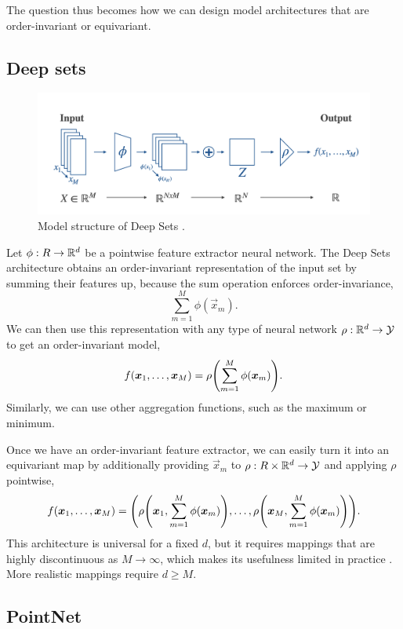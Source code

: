 The question thus becomes how we can design model architectures that are order-invariant or
equivariant.

\subsection{Deep sets}

\begin{figure}[t]
    \includegraphics[width=\textwidth]{figures/deep-sets}
    \caption{Model structure of Deep Sets \citep{zaheer2017deep}.}
    \label{fig:deep-sets}
\end{figure}

Let $\phi: R \to \mathbb{R}^d$ be a pointwise feature extractor neural network. The Deep Sets architecture
\citep{zaheer2017deep} obtains an order-invariant representation of the input set by summing their
features up, because the sum operation enforces order-invariance, \[
    \sum_{m=1}^{M} \phi(\vec{x}_m).
\]
We can then use this representation with any type of neural network $\rho: \mathbb{R}^d \to \mathcal{Y}$ to
get an order-invariant model, \[
    f(\vec{x}_1, \ldots, \vec{x}_M) = \rho \lft( \sum_{m=1}^{M} \phi(\vec{x}_m) \rgt).
\]
Similarly, we can use other aggregation functions, such as the maximum or minimum.

Once we have an order-invariant feature extractor, we can easily turn it into an equivariant map by
additionally providing $\vec{x}_m$ to $\rho: R \times \mathbb{R}^d \to \mathcal{Y}$ and applying $\rho$
pointwise, \[
    f(\vec{x}_1, \ldots, \vec{x}_M) = \lft( \rho \lft( \vec{x}_1, \sum_{m=1}^{M} \phi(\vec{x}_m) \rgt), \ldots, \rho \lft( \vec{x}_M, \sum_{m=1}^{M} \phi(\vec{x}_m) \rgt) \rgt).
\]
This architecture is universal for a fixed $d$, but it requires mappings that are highly
discontinuous as $M \to \infty$, which makes its usefulness limited in practice
\citep{wagstaff2019limitations}. More realistic mappings require $d \geq M$.

\subsection{PointNet}

